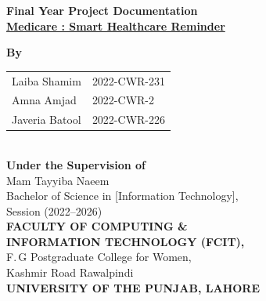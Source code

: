 \documentclass[12pt, a4paper, oneside]{report}
\begin{document}
\begin{titlepage}
\centering
\vspace*{0.5cm}
{\LARGE\bfseries Final Year Project Documentation}\\[0.5cm]
{\Large\bfseries\underline{Medicare : Smart Healthcare Reminder}}\\[1.5cm]

\vspace{2cm}

{\large\textbf{By}}\\[0.5cm]

\begin{tabular}{l l}
Laiba Shamim & 2022-CWR-231 \\
Amna Amjad & 2022-CWR-2 \\
Javeria Batool & 2022-CWR-226 \\
\end{tabular}\\[1cm]

{\large\textbf{Under the Supervision of}}\\[0.3cm]
{\large Mam Tayyiba Naeem}\\[1cm]

{\large Bachelor of Science in [Information Technology],\\
Session (2022--2026)\\[0.5cm]
\textbf{FACULTY OF COMPUTING \&\\
INFORMATION TECHNOLOGY (FCIT),}\\
F.\,G Postgraduate College for Women,\\
Kashmir Road Rawalpindi\\[0.3cm]
\textbf{UNIVERSITY OF THE PUNJAB, LAHORE}}

\vfill
\end{titlepage}
\end{document}
